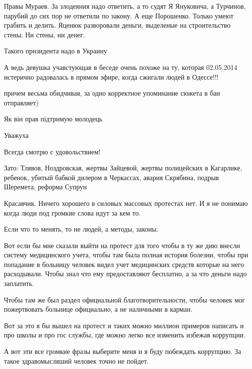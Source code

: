 \begin{itemize}

Правы Мураев. За злодеяния надо ответить, а то судят Я Януковича, а Турчинов,
парубий до сих пор не ответили по закону. А еще Порошенко. Только умеют грабить
и делить. Яценюк разворовали деньги, выделеные на строительство стены. Ни
стены, ни денег.


Такого прнзидента надо в Украину


А ведь девушка учавстующая в беседе очень похоже на ту, которая 02.05.2014
истерично радовалась в прямом эфире, когда сжигали людей в Одессе!!!

\begin{itemize} %
причем весьма обидчивая, за одно корректное упоминание сюжета в бан отправляет)
\end{itemize} %

Як він прав підтримую молодець

Уважуха

Всегда смотрю с удовольствием!


Зато: Тлявов, Ноздровская, жертвы Зайцевой, жертвы полицейских в Кагарлике,
ребенок, убитый бабкой дилером в Черкассах, авария Скрябина, подрыв Шеремета,
реформа Супрун



Красавчик. Ничего хорошего в силовых массовых протестах нет. И я не понимаю
когда люди под громкие слова идут за кем то.

Если что то менять, то не людей, а методы, законы.

Вот если бы мне сказали выйти на протест для того чтобы в ту же дию внесли
систему медицинского учета, чтобы там была полная история болезни, чтобы при
попадание в больницу человек видел учет медицинских средств которые на него
расходывали. Чтобы знал что ему предоставляют бесплатно, а за что деньги надо
заплатить.

Чтобы там же был раздел официальной благотворительности, чтобы человек мог
пожертвовать больнице официально, а не наличными в карман.

Вот за это я бы вышел на протест и таких можно миллион примеров написать и про
школы и про гос службы, где можно легко все изменить избежав коррупции.

А вот эти все громкие фразы выберите меня и я буду побеждать коррупцию. За
такое здравомысляший человек точно не пойдет.


\end{itemize}
